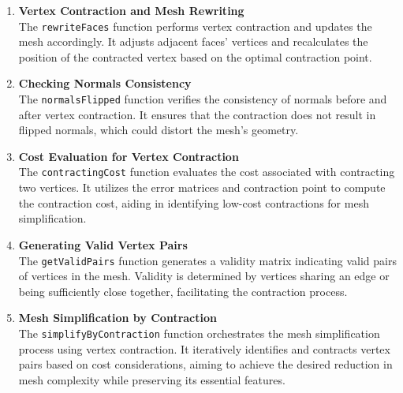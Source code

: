 \begin{enumerate}
    \item \textbf{Vertex Contraction and Mesh Rewriting} \\
    The \texttt{rewriteFaces} function performs vertex contraction and updates the mesh accordingly. It adjusts adjacent faces' vertices and recalculates the position of the contracted vertex based on the optimal contraction point.
    
    \item \textbf{Checking Normals Consistency} \\
    The \texttt{normalsFlipped} function verifies the consistency of normals before and after vertex contraction. It ensures that the contraction does not result in flipped normals, which could distort the mesh's geometry.
    
    \item \textbf{Cost Evaluation for Vertex Contraction} \\
    The \texttt{contractingCost} function evaluates the cost associated with contracting two vertices. It utilizes the error matrices and contraction point to compute the contraction cost, aiding in identifying low-cost contractions for mesh simplification.
    
    \item \textbf{Generating Valid Vertex Pairs} \\
    The \texttt{getValidPairs} function generates a validity matrix indicating valid pairs of vertices in the mesh. Validity is determined by vertices sharing an edge or being sufficiently close together, facilitating the contraction process.
    
    \item \textbf{Mesh Simplification by Contraction} \\
    The \texttt{simplifyByContraction} function orchestrates the mesh simplification process using vertex contraction. It iteratively identifies and contracts vertex pairs based on cost considerations, aiming to achieve the desired reduction in mesh complexity while preserving its essential features.
    
    \end{enumerate}


